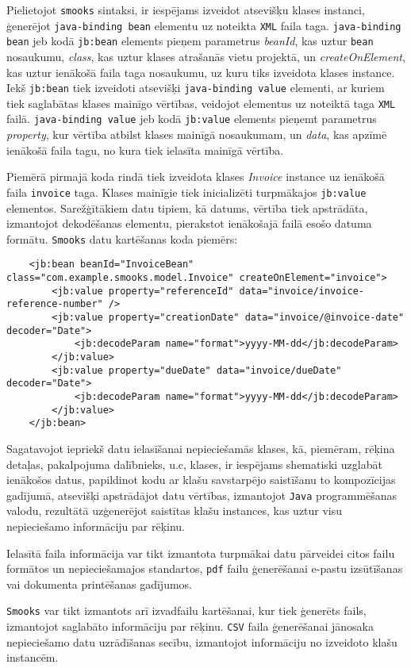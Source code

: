 \par Pielietojot \texttt{smooks} sintaksi, ir iespējams izveidot atsevišķu klases instanci, ģenerējot \texttt{java-binding bean} elementu uz noteikta \texttt{XML} faila taga. \texttt{java-binding bean} jeb kodā \texttt{jb:bean} elements pieņem parametrus \textit{beanId}, kas uztur \texttt{bean} nosaukumu, \textit{class}, kas uztur klases atrašanās vietu projektā, un \textit{createOnElement}, kas uztur ienākošā faila taga nosaukumu, uz kuru tiks izveidota klases instance. Iekš \texttt{jb:bean} tiek izveidoti atsevišķi \texttt{java-binding value} elementi, ar kuriem tiek saglabātas klases mainīgo vērtības, veidojot elementus uz noteiktā taga \texttt{XML} failā. \texttt{java-binding value} jeb kodā \texttt{jb:value} elements pieņemt parametrus \textit{property}, kur vērtība atbilst klases mainīgā nosaukumam, un \textit{data}, kas apzīmē ienākošā faila tagu, no kura tiek ielasīta mainīgā vērtība.
\par Piemērā pirmajā koda rindā tiek izveidota klases \textit{Invoice} instance uz ienākošā faila \texttt{invoice} taga. Klases mainīgie tiek inicializēti turpmākajos \texttt{jb:value} elementos. Sarežģītākiem datu tipiem, kā datums, vērtība tiek apstrādāta, izmantojot dekodēšanas elementu, pierakstot ienākošajā failā esošo datuma formātu. \texttt{Smooks} datu kartēšanas koda piemērs:
{
\begin{verbatim}
    <jb:bean beanId="InvoiceBean" class="com.example.smooks.model.Invoice" createOnElement="invoice">
        <jb:value property="referenceId" data="invoice/invoice-reference-number" />
        <jb:value property="creationDate" data="invoice/@invoice-date" decoder="Date">
            <jb:decodeParam name="format">yyyy-MM-dd</jb:decodeParam>
        </jb:value>
        <jb:value property="dueDate" data="invoice/dueDate" decoder="Date">
            <jb:decodeParam name="format">yyyy-MM-dd</jb:decodeParam>
        </jb:value>
    </jb:bean>
\end{verbatim}
}

\par Sagatavojot iepriekš datu ielasīšanai nepieciešamās klases, kā, piemēram, rēķina detaļas, pakalpojuma dalībnieks, u.c, klases, ir iespējams shematiski uzglabāt ienākošos datus, papildinot kodu ar klašu savstarpējo saistīšanu to kompozīcijas gadījumā, atsevišķi apstrādājot datu vērtības, izmantojot \texttt{Java} programmēšanas valodu, rezultātā uzģenerējot saistītas klašu instances, kas uztur visu nepieciešamo informāciju par rēķinu.
\par Ielasītā faila informācija var tikt izmantota turpmākai datu pārveidei citos failu formātos un nepieciešamajos standartos, \texttt{pdf} failu ģenerēšanai e-pastu izsūtīšanas vai dokumenta printēšanas gadījumos.
\par \texttt{Smooks} var tikt izmantots arī izvadfailu kartēšanai, kur tiek ģenerēts fails, izmantojot saglabāto informāciju par rēķinu. \texttt{CSV} faila ģenerēšanai jānosaka nepieciešamo datu uzrādīšanas secību, izmantojot informāciju no izveidoto klašu instancēm.

